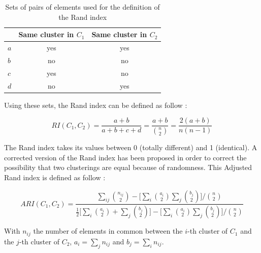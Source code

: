 \documentclass[a4paper]{report}
\begin{document}
    \begin{table}[h]
    \centering
    \begin{tabular}{l|c|c|}
    \cline{2-3}
                                       & \multicolumn{1}{l|}{\textbf{Same cluster in $C_1$}} & \multicolumn{1}{l|}{\textbf{Same cluster in $C_2$}} \\ \hline
    \multicolumn{1}{|l|}{\textbf{$a$}} & yes                                                 & yes                                                 \\ \hline
    \multicolumn{1}{|l|}{\textbf{$b$}} & no                                                  & no                                                  \\ \hline
    \multicolumn{1}{|l|}{\textbf{$c$}} & yes                                                 & no                                                  \\ \hline
    \multicolumn{1}{|l|}{\textbf{$d$}} & no                                                  & yes                                                 \\ \hline
    \end{tabular}
    \caption{Sets of pairs of elements used for the definition of the Rand index}
    \label{tab:rand_index}
    \end{table}

    Using these sets, the Rand index can be defined as follow :

    \begin{equation}
        RI(C_1, C_2) = \frac{a + b}{a + b + c + d} = \frac{a + b}{\binom{n}{2}} = \frac{2(a + b)}{n(n-1)}
        \label{eq:rand_index}
    \end{equation}

    The Rand index takes its values between 0 (totally different) and 1 (identical). A corrected version of the Rand index has been proposed in order to correct the possibility that two clusterings are equal because of randomness. This Adjusted Rand index is defined as follow :

    \begin{equation}
        ARI(C_1, C_2) = \frac{\sum_{ij}\binom{n_{ij}}{2} - \big[\sum_i\binom{a_i}{2}\sum_j\binom{b_j}{2}\big]/\binom{n}{2}}{\frac{1}{2}\big[\sum_i\binom{a_i}{2} + \sum_j\binom{b_j}{2}\big] - \big[\sum_i\binom{a_i}{2}\sum_j\binom{b_j}{2}\big]/\binom{n}{2}}
        \label{eq:adj_rand_index}
    \end{equation}

    With $n_{ij}$ the number of elements in common between the $i$-th cluster of $C_1$ and the $j$-th cluster of $C_2$, $a_i = \sum_j n_{ij}$ and $b_j = \sum_i n_{ij}$.\\
\end{document}
